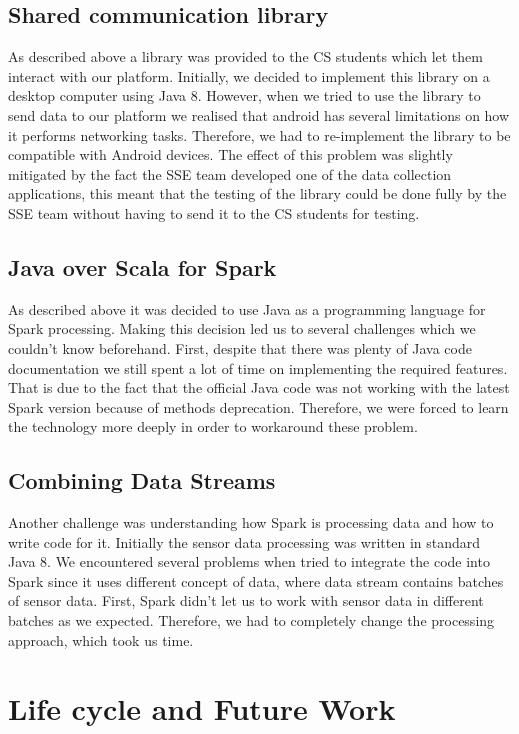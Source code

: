 \documentclass[prodmode,acmtosem]{acmsmall} %
\begin{document}
\subsection{Shared communication library}
As described above a library was provided to the CS students which let them interact with our platform. Initially, we decided to implement this library on a desktop computer using Java 8. However, when we tried to use the library to send data to our platform we realised that android has several limitations on how it performs networking tasks. Therefore, we had to re-implement the library to be compatible with Android devices. The effect of this problem was slightly mitigated by the fact the SSE team developed one of the data collection applications, this meant that the testing of the library could be done fully by the SSE team without having to send it to the CS students for testing.

\subsection{Java over Scala for Spark}
As described above it was decided to use Java as a programming language for Spark processing. Making this decision led us to several challenges which we couldn't know beforehand. First, despite that there was plenty of Java code documentation we still spent a lot of time on implementing the required features. That is due to the fact that the official Java code was not working with the latest Spark version because of methods deprecation. Therefore, we were forced to learn the technology more deeply in order to workaround these problem.

\subsection{Combining Data Streams}
Another challenge was understanding how Spark is processing data and how to write code for it. Initially the sensor data processing was written in standard Java 8. We encountered several problems when tried to integrate the code into Spark since it uses different concept of data, where data stream contains batches of sensor data. First, Spark didn't let us to work with sensor data in different batches as we expected. Therefore, we had to completely change the processing approach, which took us time.

\section{Life cycle and Future Work}
\end{document}
